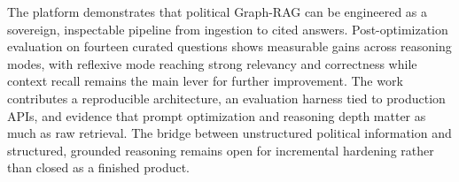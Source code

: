 The platform demonstrates that political Graph-RAG can be engineered as a sovereign, inspectable pipeline from ingestion to cited answers. Post-optimization evaluation on fourteen curated questions shows measurable gains across reasoning modes, with reflexive mode reaching strong relevancy and correctness while context recall remains the main lever for further improvement. The work contributes a reproducible architecture, an evaluation harness tied to production APIs, and evidence that prompt optimization and reasoning depth matter as much as raw retrieval. The bridge between unstructured political information and structured, grounded reasoning remains open for incremental hardening rather than closed as a finished product.
